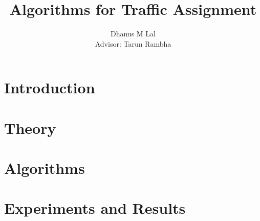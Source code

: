 \documentclass[12pt]{report}
\begin{document}
\begin{frontmatter}
\title{Algorithms for Traffic Assignment}
\author{Dhanus M Lal\\
	Advisor: Tarun Rambha}
\ms
\iisclogotrue
\maketitle
\end{frontmatter}

\tableofcontents

\chapter{Introduction}


\chapter{Theory}\label{chapter:math}


\chapter{Algorithms}\label{chapter:alg}


\chapter{Experiments and Results}\label{chapter:results}


\nocite{tarun, boyles}


\end{document}
